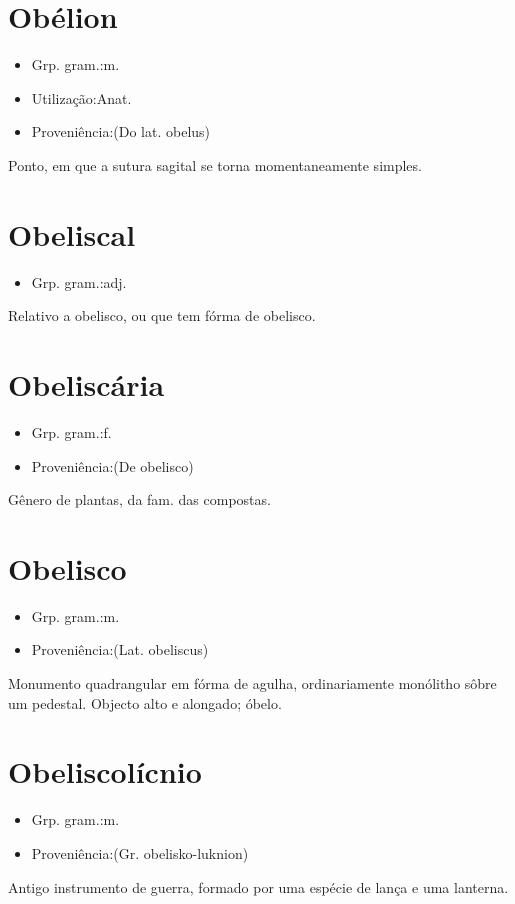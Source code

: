 \section{Obélion}
\begin{itemize}
\item {Grp. gram.:m.}
\end{itemize}
\begin{itemize}
\item {Utilização:Anat.}
\end{itemize}
\begin{itemize}
\item {Proveniência:(Do lat. \textunderscore obelus\textunderscore )}
\end{itemize}
Ponto, em que a sutura sagital se torna momentaneamente simples.
\section{Obeliscal}
\begin{itemize}
\item {Grp. gram.:adj.}
\end{itemize}
Relativo a obelisco, ou que tem fórma de obelisco.
\section{Obeliscária}
\begin{itemize}
\item {Grp. gram.:f.}
\end{itemize}
\begin{itemize}
\item {Proveniência:(De \textunderscore obelisco\textunderscore )}
\end{itemize}
Gênero de plantas, da fam. das compostas.
\section{Obelisco}
\begin{itemize}
\item {Grp. gram.:m.}
\end{itemize}
\begin{itemize}
\item {Proveniência:(Lat. \textunderscore obeliscus\textunderscore )}
\end{itemize}
Monumento quadrangular em fórma de agulha, ordinariamente monólitho sôbre um pedestal.
Objecto alto e alongado; óbelo.
\section{Obeliscolícnio}
\begin{itemize}
\item {Grp. gram.:m.}
\end{itemize}
\begin{itemize}
\item {Proveniência:(Gr. \textunderscore obelisko-luknion\textunderscore )}
\end{itemize}
Antigo instrumento de guerra, formado por uma espécie de lança e uma lanterna.
